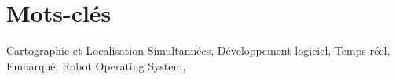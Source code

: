 \chapter*{Mots-clés}

\begin{center}
 Cartographie et Localisation Simultannées, 
 Développement logiciel,
 Temps-réel,
 Embarqué, 
 Robot Operating System,
\end{center}
